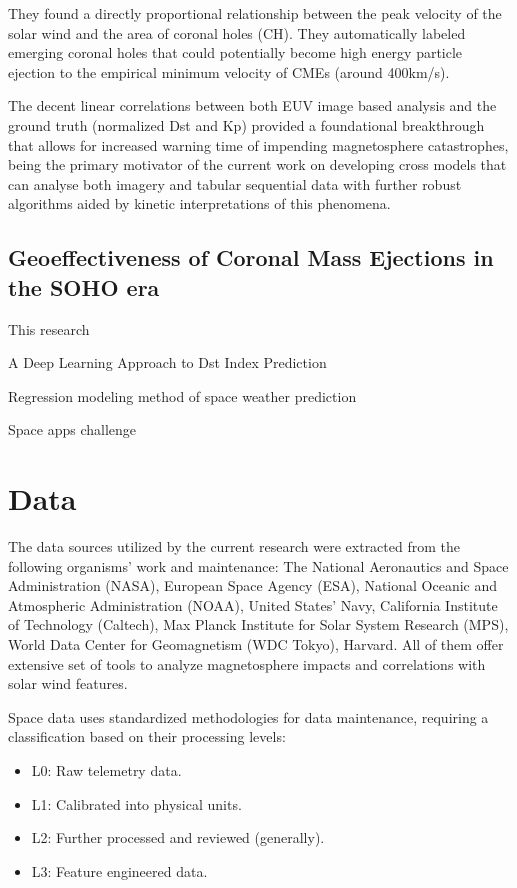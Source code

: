 \documentclass{article}
\begin{document}
They found a directly proportional relationship between the peak velocity of the solar wind and the area of coronal holes (CH). They automatically labeled emerging coronal holes that could potentially become high energy particle ejection to the empirical minimum velocity of CMEs (around 400km/s).

The decent linear correlations between both EUV image based analysis and the ground truth (normalized Dst and Kp) provided a foundational breakthrough that allows for increased warning time of impending magnetosphere catastrophes, being the primary motivator of the current work on developing cross models that can analyse both imagery and tabular sequential data with further robust algorithms aided by kinetic interpretations of this phenomena.

\subsection{Geoeffectiveness of Coronal Mass Ejections in the SOHO era}
This research \cite{related2}

A Deep Learning Approach to Dst Index Prediction

Regression modeling method of space weather prediction

Space apps challenge

\section{Data}
The data sources utilized by the current research were extracted from the following organisms' work and maintenance: The National Aeronautics and Space Administration (NASA), European Space Agency (ESA), National Oceanic and Atmospheric Administration (NOAA), United States' Navy, California Institute of Technology (Caltech), Max Planck Institute for Solar System Research (MPS), World Data Center for Geomagnetism (WDC Tokyo), Harvard. All of them offer extensive set of tools to analyze magnetosphere impacts and correlations with solar wind features.

Space data uses standardized methodologies for data maintenance, requiring a classification based on their processing levels:

\begin{itemize}
    \item L0: Raw telemetry data.
    \item L1: Calibrated into physical units.
    \item L2: Further processed and reviewed (generally).
    \item L3: Feature engineered data.
\end{itemize}
\end{document}

